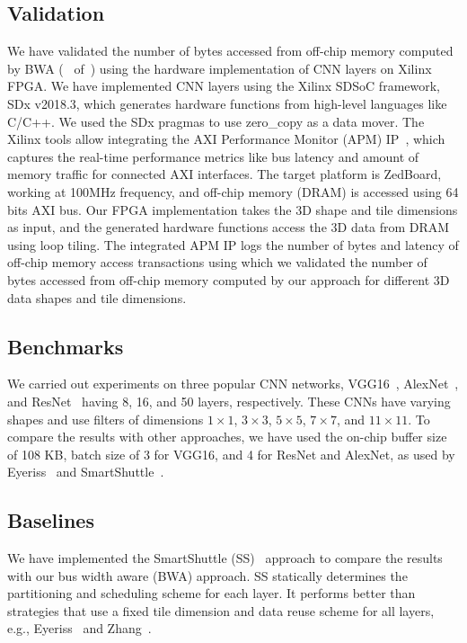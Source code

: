 \subsection{Validation}\label{Validation}
We have validated the number of bytes accessed from off-chip memory computed by BWA (~ of~) using the hardware implementation of CNN layers on Xilinx FPGA. We have implemented CNN layers using the Xilinx SDSoC framework, SDx v2018.3, which generates hardware functions from high-level languages like C/C++. We used the SDx pragmas to use zero\_copy as a data mover. The Xilinx tools allow integrating the AXI Performance Monitor (APM) IP~\cite{APM}, which captures the real-time performance metrics like bus latency and amount of memory traffic for connected AXI interfaces. The target platform is ZedBoard, working at 100MHz frequency, and off-chip memory (DRAM) is accessed using 64 bits AXI bus. 
Our FPGA implementation takes the 3D shape and tile dimensions as input, and the generated hardware functions access the 3D data from DRAM using loop tiling. The integrated APM IP logs the number of bytes and latency of off-chip memory access transactions using which we validated the number of bytes accessed from off-chip memory computed by our approach for different 3D data shapes and tile dimensions.
\subsection{Benchmarks}
We carried out experiments on three popular CNN networks, VGG16~\cite{simonyan2014very}, AlexNet~\cite{krizhevsky2012imagenet}, and ResNet~\cite{he2016deep} having 8, 16, and 50 layers, respectively. These CNNs have varying shapes and use filters of dimensions $1{\times}1$, $3{\times}3$, $5{\times}5$, $7{\times}7$, and $11{\times}11$. To compare the results with other approaches, we have used the on-chip buffer size of 108 KB, batch size of 3 for VGG16, and 4 for ResNet and AlexNet, as used by Eyeriss~\cite{chen2016eyeriss} and SmartShuttle~\cite{Li2018SmartShuttleOO}. 
\subsection{Baselines}
We have implemented the SmartShuttle (SS)~\cite{Li2018SmartShuttleOO} approach to compare the results with our bus width aware (BWA) approach. SS statically determines the partitioning and scheduling scheme for each layer. It performs better than strategies that use a fixed tile dimension and data reuse scheme for all layers, e.g., Eyeriss~\cite{chen2016eyeriss} and  Zhang~\cite{zhang2015optimizing}. 
